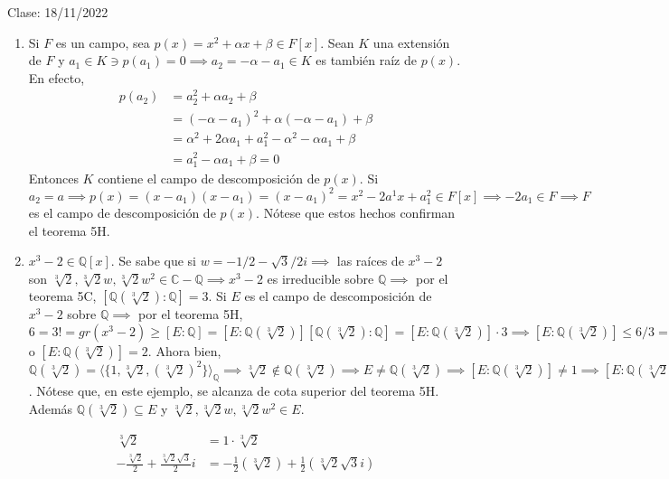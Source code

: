 Clase: 18/11/2022


\begin{ejemplo}
    \begin{enumerate}
        \item Si $F$ es un campo, sea $p(x)=x^2+\alpha x+\beta \in F[x]$. Sean $K$ una extensión de $F$ y $a_1\in K\ni p(a_1)=0\implies a_2=-\alpha -a_1\in K$ es también raíz de $p(x)$. En efecto,
        \begin{align*}
            p(a_2) &= a_2^2+\alpha a_2+\beta \\
            &= (-\alpha -a_1)^2+\alpha(-\alpha-a_1)+\beta\\
            &= \alpha^2+2\alpha a_1 + a_1^2-\alpha^2 -\alpha a_1+\beta\\
            &= a_1^2-\alpha a_1+\beta =0
        \end{align*}
        Entonces $K$ contiene el campo de descomposición de $p(x)$. Si $a_2=a\implies p(x)=(x-a_1)(x-a_1)=(x-a_1)^2=x^2-2a^1x+a_1^2\in F[x]\implies -2a_1\in F\implies F$ es el campo de descomposición de $p(x)$. Nótese que estos hechos confirman el teorema 5H.
        \item $x^3-2\in \mathbb{Q}[x]$. Se sabe que si $w=-1/2 -\sqrt{3}/2 i\implies $ las raíces de $x^3-2$ son $\sqrt[3]{2}, \sqrt[3]{2}w,\sqrt[3]{2}w^2\in \mathbb{C}-\mathbb{Q}\implies x^3-2$ es irreducible sobre $\mathbb{Q}\implies$ por el teorema 5C, $[\mathbb{Q}(\sqrt[3]{2}):\mathbb{Q}]=3$. Si $E$ es el campo de descomposición de $x^3-2$ sobre $\mathbb{Q}\implies$ por el teorema 5H, $6=3!=gr(x^3-2)\geq [E:\mathbb{Q}]=[E:\mathbb{Q}(\sqrt[3]{2})][\mathbb{Q}(\sqrt[3]{2}):\mathbb{Q}]=[E:\mathbb{Q}(\sqrt[3]{2})]\cdot 3\implies [E:\mathbb{Q}(\sqrt[3]{2})]\leq 6/3=2\implies [E:\mathbb{Q}(\sqrt[3]{2})]=1$ o $[E:\mathbb{Q}(\sqrt[3]{2})]=2$. Ahora bien, $\mathbb{Q}(\sqrt[3]{2})=\langle \{1,\sqrt[3]{2},(\sqrt[3]{2})^2\}\rangle_\mathbb{Q}\implies \sqrt[3]{2}\not\in \mathbb{Q}(\sqrt[3]{2})\implies E\neq \mathbb{Q}(\sqrt[3]{2})\implies [E:\mathbb{Q}(\sqrt[3]{2})]\neq 1\implies [E:\mathbb{Q}(\sqrt[3]{2})]=2\implies [E:\mathbb{Q}]=6$. Nótese que, en este ejemplo, se alcanza de cota superior del teorema 5H. Además $\mathbb{Q}(\sqrt[3]{2})\subseteq E$ y $\sqrt[3]{2},\sqrt[3]{2}w, \sqrt[3]{2}w^2\in E.$
        \begin{cajita}
            \begin{align*}
                \sqrt[3]{2} &=1\cdot \sqrt[3]{2}\\
                -\frac{\sqrt[3]{2}}{2}+\frac{\sqrt[3]{2}\sqrt{3}}{2}i &= -\frac{1}{2}(\sqrt[3]{2})+\frac{1}{2}(\sqrt[3]{2}\sqrt{3}i)\\

\end{align*}
\end{cajita}
\end{enumerate}
\end{ejemplo}
